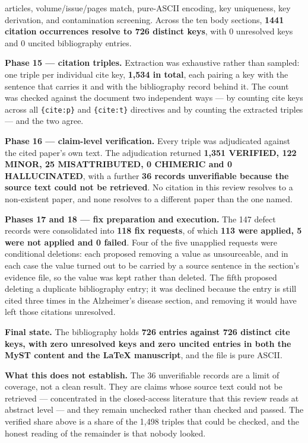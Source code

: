 \documentclass[11pt]{article}
\begin{document}
articles, volume/issue/pages match, pure-ASCII encoding, key uniqueness, key derivation, and contamination screening. Across the ten body sections, \textbf{1441 citation occurrences resolve to 726 distinct keys}, with 0 unresolved keys and 0 uncited bibliography entries.

\textbf{Phase 15 --- citation triples.} Extraction was exhaustive rather than sampled: one triple per individual cite key, \textbf{1,534 in total}, each pairing a key with the sentence that carries it and with the bibliography record behind it. The count was checked against the document two independent ways --- by counting cite keys across all \texttt{\{cite:p\}} and \texttt{\{cite:t\}} directives and by counting the extracted triples --- and the two agree.

\textbf{Phase 16 --- claim-level verification.} Every triple was adjudicated against the cited paper's own text. The adjudication returned \textbf{1,351 VERIFIED, 122 MINOR, 25 MISATTRIBUTED, 0 CHIMERIC and 0 HALLUCINATED}, with a further \textbf{36 records unverifiable because the source text could not be retrieved}. No citation in this review resolves to a non-existent paper, and none resolves to a different paper than the one named.

\textbf{Phases 17 and 18 --- fix preparation and execution.} The 147 defect records were consolidated into \textbf{118 fix requests}, of which \textbf{113 were applied, 5 were not applied and 0 failed}. Four of the five unapplied requests were conditional deletions: each proposed removing a value as unsourceable, and in each case the value turned out to be carried by a source sentence in the section's evidence file, so the value was kept rather than deleted. The fifth proposed deleting a duplicate bibliography entry; it was declined because the entry is still cited three times in the Alzheimer's disease section, and removing it would have left those citations unresolved.

\textbf{Final state.} The bibliography holds \textbf{726 entries against 726 distinct cite keys, with zero unresolved keys and zero uncited entries in both the MyST content and the LaTeX manuscript}, and the file is pure ASCII.

\textbf{What this does not establish.} The 36 unverifiable records are a limit of coverage, not a clean result. They are claims whose source text could not be retrieved --- concentrated in the closed-access literature that this review reads at abstract level --- and they remain unchecked rather than checked and passed. The verified share above is a share of the 1,498 triples that could be checked, and the honest reading of the remainder is that nobody looked.
\end{document}
